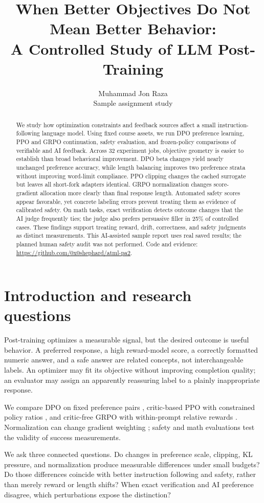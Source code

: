\documentclass{article}
\title{When Better Objectives Do Not Mean Better Behavior:\\A Controlled Study of LLM Post-Training}
\author{Muhammad Jon Raza\\Sample assignment study}
\begin{document}
\maketitle
\begin{abstract}
We study how optimization constraints and feedback sources affect a small instruction-following language model. Using fixed course assets, we run DPO preference learning, PPO and GRPO continuation, safety evaluation, and frozen-policy comparisons of verifiable and AI feedback. Across 32 experiment jobs, objective geometry is easier to establish than broad behavioral improvement. DPO beta changes yield nearly unchanged preference accuracy, while length balancing improves two preference strata without improving word-limit compliance. PPO clipping changes the cached surrogate but leaves all short-fork adapters identical. GRPO normalization changes score-gradient allocation more clearly than final response length. Automated safety scores appear favorable, yet concrete labeling errors prevent treating them as evidence of calibrated safety. On math tasks, exact verification detects outcome changes that the AI judge frequently ties; the judge also prefers persuasive filler in 25\% of controlled cases. These findings support treating reward, drift, correctness, and safety judgments as distinct measurements. This AI-assisted sample report uses real saved results; the planned human safety audit was not performed. Code and evidence: \url{https://github.com/0x0shephard/atml-pa2}.
\end{abstract}
\section{Introduction and research questions}
Post-training optimizes a measurable signal, but the desired outcome is useful behavior. A preferred response, a high reward-model score, a correctly formatted numeric answer, and a safe answer are related concepts, not interchangeable labels. An optimizer may fit its objective without improving completion quality; an evaluator may assign an apparently reassuring label to a plainly inappropriate response.

We compare DPO on fixed preference pairs \cite{dpo}, critic-based PPO with constrained policy ratios \cite{ppo}, and critic-free GRPO with within-prompt relative rewards \cite{grpo}. Normalization can change gradient weighting \cite{drgrpo}; safety and math evaluations test the validity of success measurements.

We ask three connected questions. Do changes in preference scale, clipping, KL pressure, and normalization produce measurable differences under small budgets? Do those differences coincide with better instruction following and safety, rather than merely reward or length shifts? When exact verification and AI preference disagree, which perturbations expose the distinction?
\end{document}
